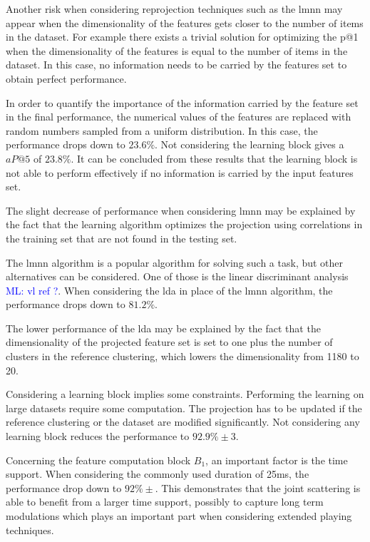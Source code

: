 \documentclass{bmcart}
\newcommand{\ml}[1]{\textcolor{blue}{ML: #1}}
\begin{document}
Another risk when considering reprojection techniques such as the lmnn may appear when the dimensionality of the features gets closer to the  number of items in the dataset. For example there exists a trivial solution for optimizing the p@1 when the dimensionality of the features is equal to the number of items in the dataset. In this case, no information needs to be carried by the features set to obtain perfect performance.

In order to quantify the importance of the information carried by the feature set in the final performance, the numerical values of the features are replaced with random numbers sampled from a uniform distribution. In this case, the performance drops down to $23.6\%$. Not considering the learning block gives a $aP@5$ of $23.8\%$. It can be concluded from these results that the learning block is not able to perform effectively if no information is carried by the input features set.

The slight decrease of performance when considering lmnn may be explained by the fact that the learning algorithm optimizes the projection using correlations in the training set that are not found in the testing set.

The lmnn algorithm is a popular algorithm for solving such a task, but other alternatives can be considered. One of those is the linear discriminant analysis \ml{vl ref ?}\cite{}. When considering the lda in place of the lmnn algorithm, the performance drops down to $81.2\%$.

The lower performance of the lda may be explained by the fact that the dimensionality of the projected feature set is set to one plus the number of clusters in the reference clustering, which lowers the dimensionality from 1180 to 20.

Considering a learning block implies some constraints. Performing the learning on large datasets require some computation. The projection has to be updated if the reference clustering or the dataset are modified significantly. Not considering any learning block reduces the performance to $92.9\% \pm 3$.

Concerning the feature computation block $B_1$, an important factor is the time support. When considering the commonly used duration of 25ms, the performance drop down to $92\% \pm$. This demonstrates that the joint scattering is able to benefit from a larger time support, possibly to capture long term modulations which plays an important part when considering extended playing techniques.
\end{document}
